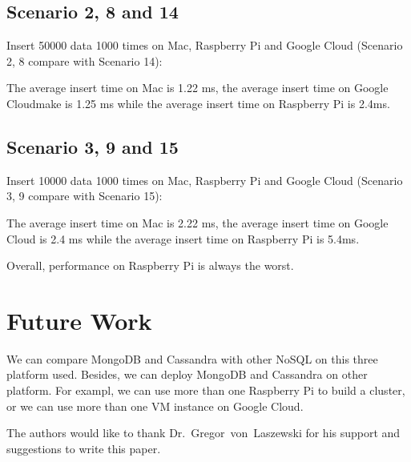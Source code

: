 \subsection{Scenario 2, 8  and 14}
Insert 50000 data 1000 times on Mac, Raspberry Pi and Google Cloud
(Scenario 2, 8 compare with Scenario 14):

The average insert time on Mac is 1.22 ms, the average insert time on 
Google Cloudmake
 is 1.25 ms while the average insert time on  Raspberry Pi is 2.4ms.


\subsection{Scenario 3, 9 and 15}
Insert 10000 data 1000 times on Mac, Raspberry Pi and Google Cloud
(Scenario 3, 9 compare with Scenario 15):

The average insert time on Mac is 2.22 ms, the average insert time on 
Google Cloud
 is 2.4 ms while the average insert time on  Raspberry Pi is 5.4ms.
 
Overall,  performance on Raspberry Pi is  always the worst.

\section{Future Work}
We can compare MongoDB and Cassandra with other NoSQL on this
three platform used. 
Besides, we can deploy MongoDB and Cassandra on other platform.
For exampl, we can use more than one Raspberry Pi to build a cluster,
or we can use more than one VM instance on Google Cloud.



\begin{acks}

  The authors would like to thank Dr.~Gregor~von~Laszewski for his
  support and suggestions to write this paper.

\end{acks}


 

